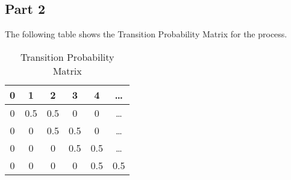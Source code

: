\subsection{Part 2}

The following table shows the Transition Probability Matrix for the process.

\begin{table}[H]
	\centering
	\caption{Transition Probability Matrix}
	\label{tab:label}
	\begin{tabular}{|c|c|c|c|c|c|}
		\hline
		0 & 1 & 2 & 3 & 4 & \ldots \\
		\hline
		0 & 0.5 & 0.5 & 0 & 0 & \ldots \\
		0 & 0 & 0.5 & 0.5 & 0 & \ldots \\
		0 & 0 & 0 & 0.5 & 0.5 & \ldots \\
		0 & 0 & 0 & 0 & 0.5 & 0.5 \\
		\hline
	\end{tabular}
\end{table}
